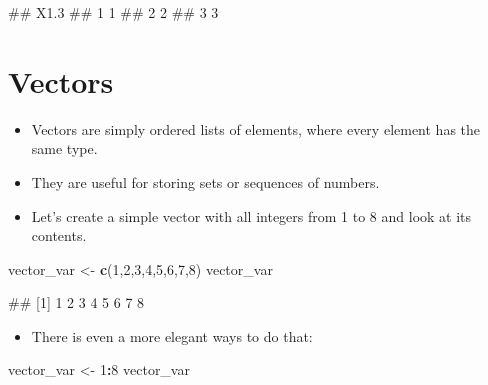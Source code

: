 \documentclass[
]{book}
\newenvironment{Shaded}{\begin{snugshade}}{\end{snugshade}}
\newcommand{\DecValTok}[1]{\textcolor[rgb]{0.00,0.00,0.81}{#1}}
\newcommand{\FunctionTok}[1]{\textcolor[rgb]{0.13,0.29,0.53}{\textbf{#1}}}
\newcommand{\NormalTok}[1]{#1}
\newcommand{\OtherTok}[1]{\textcolor[rgb]{0.56,0.35,0.01}{#1}}
\newcommand{\SpecialCharTok}[1]{\textcolor[rgb]{0.81,0.36,0.00}{\textbf{#1}}}
\providecommand{\tightlist}{%
  \setlength{\itemsep}{0pt}\setlength{\parskip}{0pt}}
\begin{document}
\begin{Shaded}
\begin{Highlighting}[]
\NormalTok{\#\#   X1.3}
\NormalTok{\#\# 1    1}
\NormalTok{\#\# 2    2}
\NormalTok{\#\# 3    3}
\end{Highlighting}
\end{Shaded}

\section{Vectors}\label{vectors}

\begin{itemize}
\tightlist
\item
  Vectors are simply ordered lists of elements, where every element has the same type.
\item
  They are useful for storing sets or sequences of numbers.
\item
  Let's create a simple vector with all integers from 1 to 8 and look at its contents.
\end{itemize}

\begin{Shaded}
\begin{Highlighting}[]
\NormalTok{vector\_var }\OtherTok{\textless{}{-}} \FunctionTok{c}\NormalTok{(}\DecValTok{1}\NormalTok{,}\DecValTok{2}\NormalTok{,}\DecValTok{3}\NormalTok{,}\DecValTok{4}\NormalTok{,}\DecValTok{5}\NormalTok{,}\DecValTok{6}\NormalTok{,}\DecValTok{7}\NormalTok{,}\DecValTok{8}\NormalTok{)}
\NormalTok{vector\_var}
\end{Highlighting}
\end{Shaded}

\begin{Shaded}
\begin{Highlighting}[]
\NormalTok{\#\# [1] 1 2 3 4 5 6 7 8}
\end{Highlighting}
\end{Shaded}

\begin{itemize}
\tightlist
\item
  There is even a more elegant ways to do that:
\end{itemize}

\begin{Shaded}
\begin{Highlighting}[]
\NormalTok{vector\_var }\OtherTok{\textless{}{-}} \DecValTok{1}\SpecialCharTok{:}\DecValTok{8}
\NormalTok{vector\_var}
\end{Highlighting}
\end{Shaded}
\end{document}
